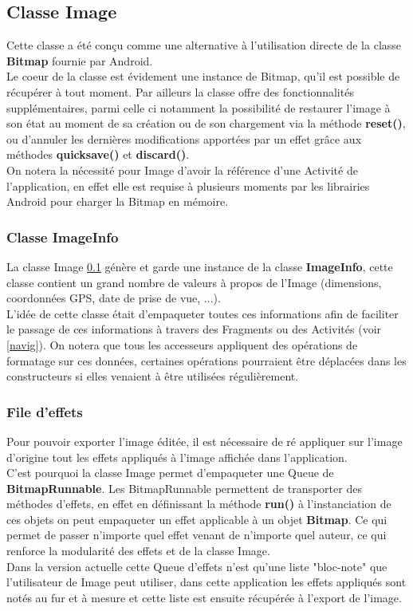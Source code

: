 \subsection{Classe \textbf{Image}} \label{classeImage}
Cette classe a été conçu comme une alternative à l'utilisation directe de la classe \textbf{Bitmap} fournie par Android.
\\
Le coeur de la classe est évidement une instance de Bitmap, qu'il est possible de récupérer à tout moment. Par ailleurs la classe offre des fonctionnalités supplémentaires, parmi celle ci notamment la possibilité de restaurer l'image à son état au moment de sa création ou de son chargement via la méthode \textbf{reset()}, ou d'annuler les dernières modifications apportées par un effet grâce aux méthodes \textbf{quicksave()} et \textbf{discard()}.
\\

On notera la nécessité pour Image d'avoir la référence d'une Activité de l'application, en effet elle est requise à plusieurs moments par les librairies Android pour charger la Bitmap en mémoire.

\subsubsection{Classe \textbf{ImageInfo}}
La classe Image \ref{classeImage} génère et garde une instance de la classe \textbf{ImageInfo}, cette classe contient un grand nombre de valeurs à propos de l'Image (dimensions, coordonnées GPS, date de prise de vue, ...).
\\
L'idée de cette classe était d'empaqueter toutes ces informations afin de faciliter le passage de ces informations à travers des Fragments ou des Activités (voir \ref{navig}). On notera que tous les accesseurs appliquent des opérations de formatage sur ces données, certaines opérations pourraient être déplacées dans les constructeurs si elles venaient à être utilisées régulièrement.


\subsubsection{File d'effets} \label{file_effets}
Pour pouvoir exporter l'image éditée, il est nécessaire de ré appliquer sur l'image d'origine tout les effets appliqués à l'image affichée dans l'application.
\\
C'est pourquoi la classe Image permet d'empaqueter une Queue de \textbf{BitmapRunnable}. Les BitmapRunnable permettent de transporter des méthodes d'effets, en effet en définissant la méthode \textbf{run()} à l'instanciation de ces objets on peut empaqueter un effet applicable à un objet \textbf{Bitmap}. Ce qui permet de passer n'importe quel effet venant de n'importe quel auteur, ce qui renforce la modularité des effets et de la classe Image.
\\
Dans la version actuelle cette Queue d'effets n'est qu'une liste "bloc-note" que l'utilisateur de Image peut utiliser, dans cette application les effets appliqués sont notés au fur et à mesure et cette liste est ensuite récupérée à l'export de l'image.



